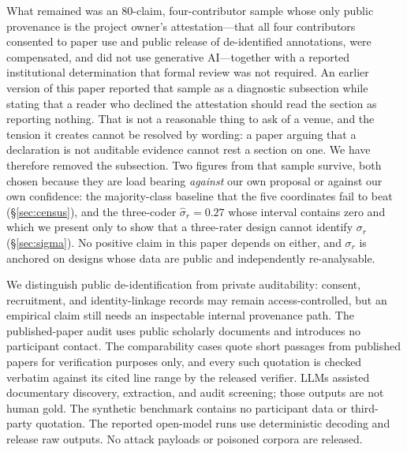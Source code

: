 \documentclass[11pt]{article}
\begin{document}
What remained was an 80-claim, four-contributor sample whose only public
provenance is the project owner's attestation---that all four contributors
consented to paper use and public release of de-identified annotations, were
compensated, and did not use generative AI---together with a reported
institutional determination that formal review was not required. An earlier
version of this paper reported that sample as a diagnostic subsection while
stating that a reader who declined the attestation should read the section as
reporting nothing. That is not a reasonable thing to ask of a venue, and the
tension it creates cannot be resolved by wording: a paper arguing that a
declaration is not auditable evidence cannot rest a section on one. We have
therefore removed the subsection. Two figures from that sample survive, both
chosen because they are load bearing \emph{against} our own proposal or against
our own confidence: the majority-class baseline that the five coordinates fail
to beat (\S\ref{sec:census}), and the three-coder $\hat\sigma_r=0.27$ whose
interval contains zero and which we present only to show that a three-rater
design cannot identify $\sigma_r$ (\S\ref{sec:sigma}). No positive claim in
this paper depends on either, and $\sigma_r$ is anchored on designs whose data
are public and independently re-analysable.

We distinguish public de-identification from private auditability: consent,
recruitment, and identity-linkage records may remain access-controlled, but an
empirical claim still needs an inspectable internal provenance path. The
published-paper audit uses public scholarly documents and introduces no
participant contact. The comparability cases quote short passages from
published papers for verification purposes only, and every such quotation is
checked verbatim against its cited line range by the released verifier. LLMs
assisted documentary discovery, extraction, and audit screening; those outputs
are not human gold.
The synthetic benchmark contains no participant data or third-party
quotation. The reported open-model runs use deterministic decoding and release
raw outputs. No attack payloads or poisoned corpora are released.

\clearpage


\clearpage
\appendix


\end{document}
